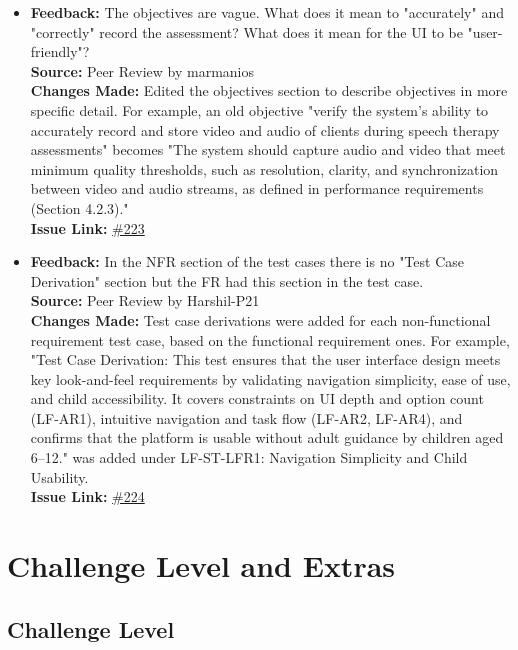 \documentclass{article}
\begin{document}
\begin{itemize}
    \item 
      \textbf{Feedback:} The objectives are vague. What does it mean to "accurately" and "correctly" record the assessment? What does it mean for the UI to be "user-friendly"? \\
      \textbf{Source:} Peer Review by marmanios \\
      \textbf{Changes Made:} Edited the objectives section to describe objectives in more specific detail. For example, an old objective "verify the system's ability to accurately record and store video and audio of clients during speech therapy assessments" becomes "The system should capture audio and video that meet minimum quality thresholds, such as resolution, clarity, and synchronization between video and audio streams, as defined in performance requirements (Section 4.2.3)."\\
      \textbf{Issue Link:} \href{https://github.com/parishanizam/TeleHealth/issues/223}{\#223}

    \item 
      \textbf{Feedback:} In the NFR section of the test cases there is no "Test Case Derivation" section but the FR had this section in the test case. \\
      \textbf{Source:} Peer Review by Harshil-P21 \\
      \textbf{Changes Made:} Test case derivations were added for each non-functional requirement test case, based on the functional requirement ones. For example, "Test Case Derivation: This test ensures that the user interface design meets key look-and-feel requirements by validating navigation simplicity, ease of use, and child accessibility. It covers constraints on UI depth and option count (LF-AR1), intuitive navigation and task flow (LF-AR2, LF-AR4), and confirms that the platform is usable without adult guidance by children aged 6–12." was added under LF-ST-LFR1: Navigation Simplicity and Child Usability.\\
      \textbf{Issue Link:} \href{https://github.com/parishanizam/TeleHealth/issues/224}{\#224}

\end{itemize}

\section{Challenge Level and Extras}

\subsection{Challenge Level}
\end{document}
